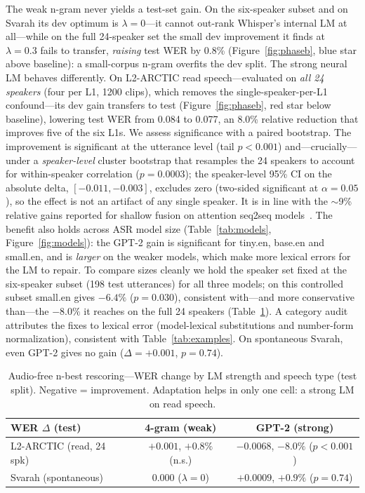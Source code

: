 \documentclass[conference]{IEEEtran}
\begin{document}
The weak n-gram never yields a test-set gain. On the six-speaker subset and on Svarah its dev optimum is $\lambda=0$---it cannot out-rank Whisper's internal LM at all---while on the full 24-speaker set the small dev improvement it finds at $\lambda=0.3$ fails to transfer, \emph{raising} test WER by 0.8\% (Figure~\ref{fig:phaseb}, blue star above baseline): a small-corpus n-gram overfits the dev split. The strong neural LM behaves differently. On L2-ARCTIC read speech---evaluated on \emph{all 24 speakers} (four per L1, 1200 clips), which removes the single-speaker-per-L1 confound---its dev gain transfers to test (Figure~\ref{fig:phaseb}, red star below baseline), lowering test WER from 0.084 to 0.077, an 8.0\% relative reduction that improves five of the six L1s. We assess significance with a paired bootstrap. The improvement is significant at the utterance level (tail $p<0.001$) and---crucially---under a \emph{speaker-level} cluster bootstrap that resamples the 24 speakers to account for within-speaker correlation ($p=0.0003$); the speaker-level 95\% CI on the absolute delta, $[-0.011,-0.003]$, excludes zero (two-sided significant at $\alpha=0.05$), so the effect is not an artifact of any single speaker. It is in line with the $\sim$9\% relative gains reported for shallow fusion on attention seq2seq models~\cite{kannan}. The benefit also holds across ASR model size (Table~\ref{tab:models}, Figure~\ref{fig:models}): the GPT-2 gain is significant for tiny.en, base.en and small.en, and is \emph{larger} on the weaker models, which make more lexical errors for the LM to repair. To compare sizes cleanly we hold the speaker set fixed at the six-speaker subset (198 test utterances) for all three models; on this controlled subset small.en gives $-6.4\%$ ($p=0.030$), consistent with---and more conservative than---the $-8.0\%$ it reaches on the full 24 speakers (Table~\ref{tab:phaseb}). A category audit attributes the fixes to lexical error (model-lexical substitutions and number-form normalization), consistent with Table~\ref{tab:examples}. On spontaneous Svarah, even GPT-2 gives no gain ($\Delta=+0.001$, $p=0.74$).

\begin{table}[t]
\centering
\caption{Audio-free n-best rescoring---WER change by LM strength and speech type (test split). Negative = improvement. Adaptation helps in only one cell: a strong LM on read speech.}
\label{tab:phaseb}
\begin{tabular}{@{}lcc@{}}
\toprule
WER $\Delta$ (test) & 4-gram (weak) & GPT-2 (strong) \\
\midrule
L2-ARCTIC (read, 24 spk) & $+0.001$, $+0.8\%$ (n.s.) & $-0.0068$, $-8.0\%$ ($p{<}0.001$) \\
Svarah (spontaneous) & $0.000$ ($\lambda{=}0$) & $+0.0009$, $+0.9\%$ ($p{=}0.74$) \\
\bottomrule
\end{tabular}
\end{table}
\end{document}

